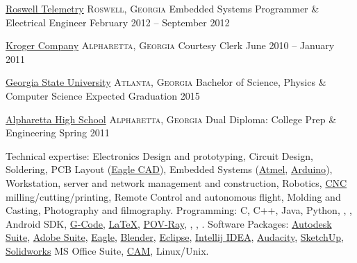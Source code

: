 \documentclass[10pt,a4paper]{article}
\begin{document}
\headedsection
  {\href{http://www.roswelltelemetry.com}{Roswell Telemetry}}
  {\textsc{Roswell, Georgia}} {%
  \headedsubsection
    {Embedded Systems Programmer \& Electrical Engineer}
    {February 2012 -- September 2012}
    {}
}

\headedsection
  {\href{https://www.kroger.com/}{Kroger Company}}
  {\textsc{Alpharetta, Georgia}} {%
  \headedsubsection
    {Courtesy Clerk}
    {June 2010 -- January 2011}
    {}
}


\spacedhrule{0.2em}{-0.4em}


\headedsection
  {\href{http://www.gsu.edu}{Georgia State University}}
  {\textsc{Atlanta, Georgia}} {%
  \headedsubsection
    {Bachelor of Science, Physics \& Computer Science}
    {Expected Graduation 2015}
    {}
}

\headedsection
  {\href{http://school.fultonschools.org/hs/alpharetta/pages/default.aspx}{Alpharetta High School}}
  {\textsc{Alpharetta, Georgia}} {%
  \headedsubsection
    {Dual Diploma: College Prep \& Engineering}
    {Spring 2011} {}
}

\spacedhrule{0.5em}{-0.4em}


\inlineheadsection  %
  {Technical expertise:}
  {Electronics Design and prototyping, Circuit Design, Soldering, PCB Layout  (\href{http://www.cadsoftusa.com/}{Eagle CAD}), Embedded Systems (\href{http://www.atmel.com/}{Atmel}, \href{http://www.arduino.cc/}{Arduino}), Workstation, server and network management and construction, Robotics, \href{http://en.wikipedia.org/wiki/Numerical_control}{CNC} milling/cutting/printing, Remote Control and autonomous flight, Molding and Casting, Photography and filmography.
  }
  \vspace{0.5em}
  \inlineheadsection
  {Programming:}
  {C, C++, Java, Python, , , Android SDK, \href{http://en.wikipedia.org/wiki/G-code}{G-Code}, \href{http://www.latex-project.org}{\LaTeX}, \href{http://www.povray.org/}{POV-Ray}, , , .
  }
    \vspace{0.5em}
  \inlineheadsection
  {Software Packages:}
  {\href{http://www.autodesk.com/}{Autodesk Suite}, \href{http://www.adobe.com/}{Adobe Suite}, \href{http://www.cadsoftusa.com/}{Eagle}, \href{http://www.blender.org/}{Blender}, \href{https://www.eclipse.org/}{Eclipse}, \href{http://www.jetbrains.com/idea/}{Intellij IDEA}, \href{http://audacity.sourceforge.net/}{Audacity}, \href{http://www.sketchup.com/}{SketchUp}, \href{http://www.solidworks.com/}{Solidworks} MS Office Suite, \href{http://en.wikipedia.org/wiki/Computer-aided_manufacturing}{CAM}, Linux/Unix.}
  
\end{document}
